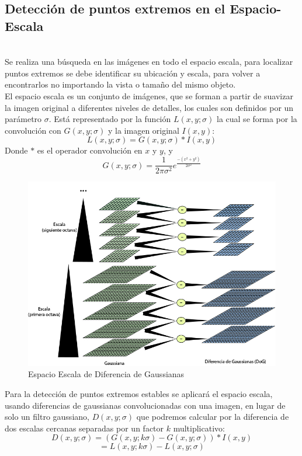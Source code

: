 	\subsection{Detección de puntos extremos en el Espacio-Escala} \hfill \\
		Se realiza una búsqueda en las imágenes en todo el espacio escala, para localizar puntos extremos se debe identificar su ubicación y escala, para volver a encontrarlos no importando la vista o tamaño del mismo objeto.\\
		El espacio escala es un conjunto de imágenes, que se forman a partir de suavizar la imagen original a diferentes niveles de detalles, los cuales son definidos por un parámetro $\sigma$. Está representado por la función $L(x,y;\sigma)$ la cual se forma por la convolución con $G(x,y;\sigma)$ y la imagen original $I(x,y)$:
		$$L(x,y;\sigma) = G(x,y;\sigma) * I(x,y)$$
		Donde $*$ es el operador convolución en $x$ y $y$, y
		$$ G(x,y;\sigma) = \frac{1}{2\pi\sigma^2}e^{\frac{-(x^2+y^2)}{2\sigma^2}}$$
		\begin{figure}[h]
			\centering
				\includegraphics[scale=0.5]{img/spaceScale.jpg}
			\caption{Espacio Escala de Diferencia de Gaussianas}
		\end{figure}		
		Para la detección de puntos extremos estables se aplicará el espacio escala, usando diferencias de gaussianas convolucionadas con una imagen, en lugar de solo un filtro gaussiano, $D(x,y;\sigma)$  que podremos calcular por la diferencia de dos escalas cercanas separadas por un factor $k$ multiplicativo:
		$$D(x,y;\sigma) = (G(x,y;k\sigma) - G(x,y;\sigma)) * I(x,y)$$ $$= L(x,y;k\sigma) - L(x,y;\sigma)$$
